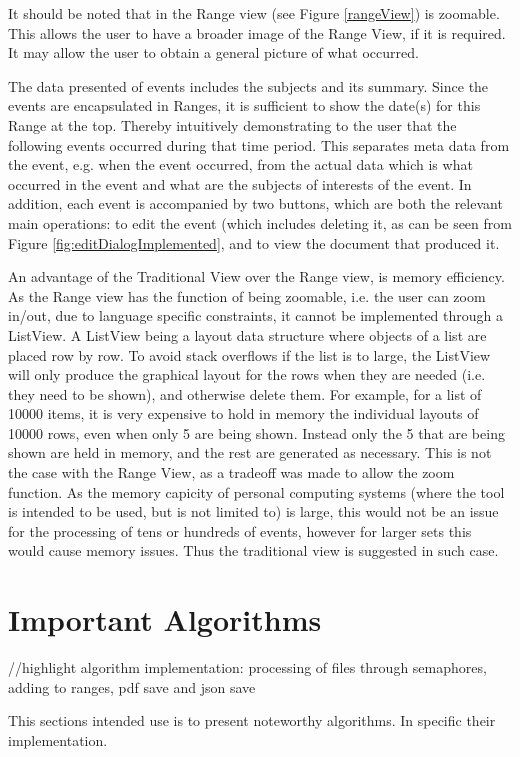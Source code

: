 \par It should be noted that in the Range view (see Figure \ref{rangeView}) is zoomable. This allows the user to have a broader image of the Range View, if it is required. It may allow the user to obtain a general picture of what occurred.
\par The data presented of events includes the subjects and its summary. Since the events are encapsulated in Ranges, it is sufficient to show the date(s) for this Range at the top. Thereby intuitively demonstrating to the user that the following events occurred during that time period. This separates meta data from the event, e.g. when the event occurred, from the actual data which is what occurred in the event and what are the subjects of interests of the event. In addition, each event is accompanied by two buttons, which are both the relevant main operations: to edit the event (which includes deleting it, as can be seen from Figure \ref{fig:editDialogImplemented}, and to view the document that produced it.
\par An advantage of the Traditional View over the Range view, is memory efficiency. As the Range view has the function of being zoomable, i.e. the user can zoom in/out, due to language specific constraints, it cannot be implemented through a ListView. A ListView being a layout data structure where objects of a list are placed row by row. To avoid stack overflows if the list is to large, the ListView will only produce the graphical layout for the rows when they are needed (i.e. they need to be shown), and otherwise delete them. For example, for a list of 10000 items, it is very expensive to hold in memory the individual layouts of 10000 rows, even when only 5 are being shown. Instead only the 5 that are being shown are held in memory, and the rest are generated as necessary. This is not the case with the Range View, as a tradeoff was made to allow the zoom function. As the memory capicity of personal computing systems (where the tool is intended to be used, but is not limited to) is large, this would not be an issue for the processing of tens or hundreds of events, however for larger sets this would cause memory issues. Thus the traditional view is suggested in such case.
\section{Important Algorithms}
//highlight algorithm implementation: processing of files through semaphores, adding to ranges, pdf save and json save
\par This sections intended use is to present noteworthy algorithms. In specific their implementation.
